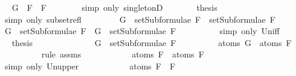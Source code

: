 \begin{isabellebody}
\ \isamarkupfalse%
\ {\isachardoublequoteopen}G\ {\isacharequal}\ F{}\ \isactrlbold {\isasymand}\ F{}{\isachardoublequoteclose}\isanewline
\ \ \ \ \ \ \isamarkupfalse%
\ {\isacharparenleft}simp\ only{\isacharcolon}\ singletonD{\isacharparenright}\isanewline
\ \ \ \ \isamarkupfalse%
\ \isamarkupfalse%
\ {\isacharquery}thesis\isanewline
\ \ \ \ \ \ \isamarkupfalse%
\ {\isacharparenleft}simp\ only{\isacharcolon}\ subset{\isacharunderscore}refl{\isacharparenright}\isanewline
\ \ \isamarkupfalse%
\isanewline
\ \ \ \ \isamarkupfalse%
\ {\isachardoublequoteopen}G\ {\isasymin}\ setSubformulae\ F{}\ {\isasymunion}\ setSubformulae\ F{}{\isachardoublequoteclose}\isanewline
\ \ \ \ \isamarkupfalse%
\ \isamarkupfalse%
\ {\isachardoublequoteopen}G\ {\isasymin}\ setSubformulae\ F{}\ {\isasymor}\ G\ {\isasymin}\ setSubformulae\ F{}{\isachardoublequoteclose}\ \ \isanewline
\ \ \ \ \ \ \isamarkupfalse%
\ {\isacharparenleft}simp\ only{\isacharcolon}\ Un{\isacharunderscore}iff{\isacharparenright}\isanewline
\ \ \ \ \isamarkupfalse%
\ \isamarkupfalse%
\ {\isacharquery}thesis\isanewline
\ \ \ \ \isamarkupfalse%
\ \isanewline
\ \ \ \ \ \ \isamarkupfalse%
\ {\isachardoublequoteopen}G\ {\isasymin}\ setSubformulae\ F{}{\isachardoublequoteclose}\isanewline
\ \ \ \ \ \ \isamarkupfalse%
\ \isamarkupfalse%
\ {\isachardoublequoteopen}atoms\ G\ {\isasymsubseteq}\ atoms\ F{}{\isachardoublequoteclose}\isanewline
\ \ \ \ \ \ \ \ \isamarkupfalse%
\ {\isacharparenleft}rule\ assms{\isacharparenleft}{}{\isacharparenright}{\isacharparenright}\isanewline
\ \ \ \ \ \ \isamarkupfalse%
\ \isamarkupfalse%
\ {\isachardoublequoteopen}{\isasymdots}\ {\isasymsubseteq}\ atoms\ F{}\ {\isasymunion}\ atoms\ F{}{\isachardoublequoteclose}\isanewline
\ \ \ \ \ \ \ \ \isamarkupfalse%
\ {\isacharparenleft}simp\ only{\isacharcolon}\ Un{\isacharunderscore}upper{}{\isacharparenright}\isanewline
\ \ \ \ \ \ \isamarkupfalse%
\ \isamarkupfalse%
\ {\isachardoublequoteopen}{\isasymdots}\ {\isacharequal}\ atoms\ {\isacharparenleft}F{}\ \isactrlbold {\isasymand}\ F{}{\isacharparenright}{\isachardoublequoteclose}\isanewline

\end{isabellebody}

